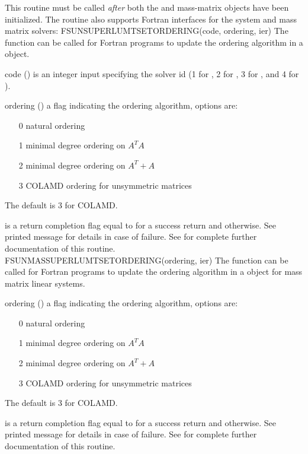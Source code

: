 {
  This routine must be
  called \emph{after} both the {\nvector} and {\sunmatrix} mass-matrix
  objects have been initialized.
}
The  routine also supports Fortran
interfaces for the system and mass matrix solvers:
%
%
{
  FSUNSUPERLUMTSETORDERING(code, ordering, ier)
}
{
  The function  can be called for Fortran programs
  to update the ordering algorithm in a {\sunlinsolslumt} object.
}
{
  \begin{args}[ordering]
  \item[code] ()
    is an integer input specifying the solver id (1 for {\cvode}, 2
    for {\ida}, 3 for {\kinsol}, and 4 for {\arkode}).
  \item[ordering] ()
    a flag indicating the ordering algorithm, options are:
    \begin{itemize}
    \item[0] natural ordering
    \item[1] minimal degree ordering on $A^TA$
    \item[2] minimal degree ordering on $A^T+A$
    \item[3] COLAMD ordering for unsymmetric matrices
    \end{itemize}
    The default is 3 for COLAMD.
  \end{args}
}
{
   is a  return completion flag equal to  for a success
  return and  otherwise. See printed message for details in case
  of failure.
}
{
  See  for complete further
  documentation of this routine.
}
%
%
{
  FSUNMASSUPERLUMTSETORDERING(ordering, ier)
}
{
  The function  can be called for Fortran
  programs to update the ordering algorithm in a {\sunlinsolslumt}
  object for mass matrix linear systems.
}
{
  \begin{args}[ordering]
  \item[ordering] ()
    a flag indicating the ordering algorithm, options are:
    \begin{itemize}
    \item[0] natural ordering
    \item[1] minimal degree ordering on $A^TA$
    \item[2] minimal degree ordering on $A^T+A$
    \item[3] COLAMD ordering for unsymmetric matrices
    \end{itemize}
    The default is 3 for COLAMD.
  \end{args}
}
{
   is a  return completion flag equal to  for a success
  return and  otherwise. See printed message for details in case
  of failure.
}
{
  See  for complete further
  documentation of this routine.
}


